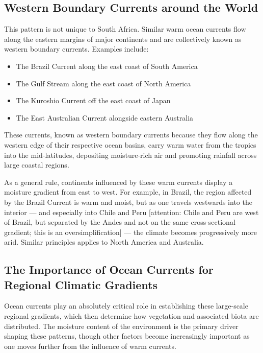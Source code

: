 \documentclass[
  11pt,
]{book}
\providecommand{\tightlist}{%
  \setlength{\itemsep}{0pt}\setlength{\parskip}{0pt}}
\begin{document}
\subsection{Western Boundary Currents around the
World}\label{western-boundary-currents-around-the-world}

This pattern is not unique to South Africa. Similar warm ocean currents
flow along the eastern margins of major continents and are collectively
known as western boundary currents. Examples include:

\begin{itemize}
\tightlist
\item
  The Brazil Current along the east coast of South America
\item
  The Gulf Stream along the east coast of North America
\item
  The Kuroshio Current off the east coast of Japan
\item
  The East Australian Current alongside eastern Australia
\end{itemize}

These currents, known as western boundary currents because they flow
along the western edge of their respective ocean basins, carry warm
water from the tropics into the mid-latitudes, depositing moisture-rich
air and promoting rainfall across large coastal regions.

As a general rule, continents influenced by these warm currents display
a moisture gradient from east to west. For example, in Brazil, the
region affected by the Brazil Current is warm and moist, but as one
travels westwards into the interior --- and especially into Chile and
Peru {[}attention: Chile and Peru are west of Brazil, but separated by
the Andes and not on the same cross-sectional gradient; this is an
oversimplification{]} --- the climate becomes progressively more arid.
Similar principles applies to North America and Australia.

\subsection{The Importance of Ocean Currents for Regional Climatic
Gradients}\label{the-importance-of-ocean-currents-for-regional-climatic-gradients}

Ocean currents play an absolutely critical role in establishing these
large-scale regional gradients, which then determine how vegetation and
associated biota are distributed. The moisture content of the
environment is the primary driver shaping these patterns, though other
factors become increasingly important as one moves further from the
influence of warm currents.
\end{document}
